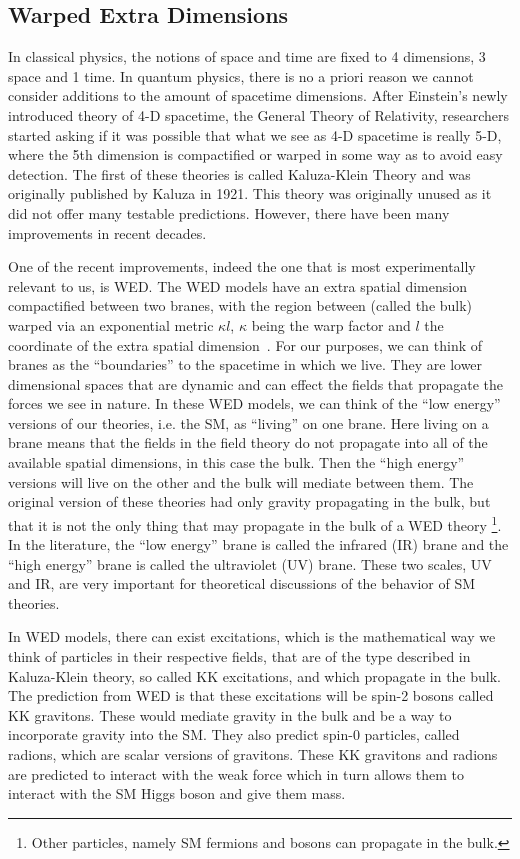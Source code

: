 \subsection{Warped Extra Dimensions}

In classical physics, the notions of space and time are fixed to 4 dimensions, 3 space and 1 time.
In quantum physics, there is no a priori reason we cannot consider additions to the amount of spacetime dimensions.
After Einstein's newly introduced theory of 4-D spacetime, the General Theory of Relativity, researchers started asking if it was possible that what we see as 4-D spacetime is really 5-D, where the 5th dimension is compactified or warped in some way as to avoid easy detection.
The first of these theories is called Kaluza-Klein Theory and was originally published by Kaluza in 1921. This theory was originally unused as it did not offer many testable predictions. However, there have been many improvements in recent decades.

One of the recent improvements, indeed the one that is most experimentally relevant to us, is WED. 
The WED models have an extra spatial dimension compactified between two branes, with the region between (called the bulk) warped via an exponential metric ${\kappa l}$, $\kappa$ being the warp factor and $l$ the coordinate of the extra spatial dimension~\cite{Giudice:2000av}. 
For our purposes, we can think of branes as the ``boundaries'' to the spacetime in which we live. They are lower dimensional spaces that are dynamic and can effect the fields that propagate the forces we see in nature.
In these WED models, we can think of the ``low energy'' versions of our theories, i.e. the SM, as ``living'' on one brane. Here living on a brane means that the fields in the field theory do not propagate into all of the available spatial dimensions, in this case the bulk.
Then the ``high energy'' versions will live on the other and the bulk will mediate between them. The original version of these theories had only gravity propagating in the bulk, but that it is not the only thing that may propagate in the bulk of a WED theory \footnote{Other particles, namely SM fermions and bosons can propagate in the bulk.}.
In the literature, the ``low energy'' brane is called the infrared (IR) brane and the ``high energy'' brane is called the ultraviolet (UV) brane. 
These two scales, UV and IR, are very important for theoretical discussions of the behavior of SM theories.

In WED models, there can exist excitations, which is the mathematical way we think of particles in their respective fields, that are of the type described in Kaluza-Klein theory, so called KK excitations, and which propagate in the bulk.
The prediction from WED is that these excitations will be spin-2 bosons called KK gravitons. These would mediate gravity in the bulk and be a way to incorporate gravity into the SM. 
They also predict spin-0 particles, called radions, which are scalar versions of gravitons. 
These KK gravitons and radions are predicted to interact with the weak force which in turn allows them to interact with the SM Higgs boson and give them mass.

